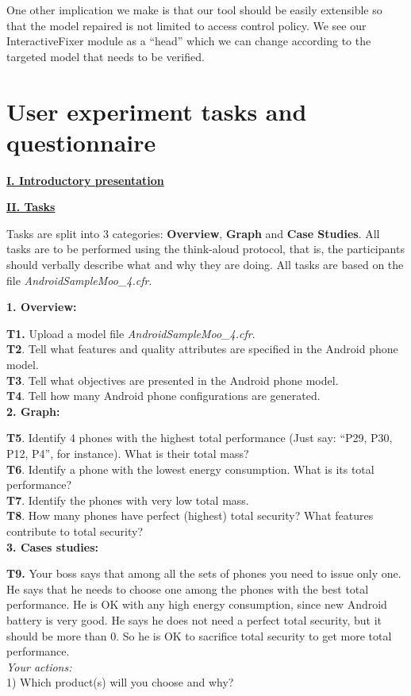 \documentclass{acm_proc_article-sp}
\begin{document}
One other implication we make is that our tool should be easily extensible so that the model repaired is not limited to access control policy. We see our InteractiveFixer module as a ``head'' which we can change according to the targeted model that needs to be verified. 


{}


\appendix
\section{User experiment tasks and questionnaire} \label{A}

\underline{ \textbf{I. Introductory presentation}}

\underline{ \textbf{II. Tasks}}

Tasks are split into 3 categories: \textbf{Overview}, \textbf{Graph} and \textbf{Case Studies}. All tasks are to be performed using the think-aloud protocol, that is, the participants should verbally describe what and why they are doing. All tasks are based on the file \textit{AndroidSampleMoo\_4.cfr}.

\textbf{1. Overview:}

\textbf{T1.} Upload a model file \textit{AndroidSampleMoo\_4.cfr}.\\
\textbf{T2}. Tell what features and quality attributes are specified in the Android phone model.\\
\textbf{T3}. Tell what objectives are presented in the Android phone model.\\
\textbf{T4}. Tell how many Android phone configurations are generated.\\

\textbf{2. Graph:}

\textbf{T5}. Identify 4 phones with the highest total performance (Just say: “P29, P30, P12, P4”, for instance). What is their total mass?\\
\textbf{T6}. Identify a phone with the lowest energy consumption. What is its total performance?\\
\textbf{T7}. Identify the phones with very low total mass.\\
\textbf{T8}. How many phones have perfect (highest) total security? What features contribute to total security?\\

\textbf{3. Cases studies:}

\textbf{T9.} Your boss says that among all the sets of phones you need to issue only one. He says that he needs to choose one among the phones with the best total performance. He is OK with any high energy consumption, since new Android battery is very good. He says he does not need a perfect total security, but it should be more than 0. So he is OK to sacrifice total security to get more total performance.\\
\textit{Your actions:}\\
1) Which product(s) will you choose and why?\\
\end{document}
